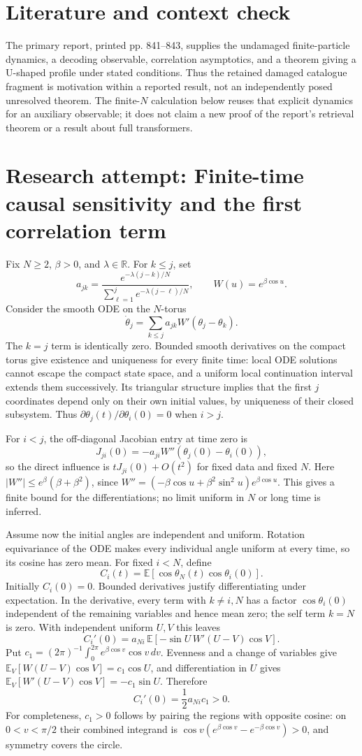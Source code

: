 \documentclass[11pt]{article}
\begin{document}
\section{Literature and context check}
The primary report, printed pp. 841--843, supplies the undamaged finite-particle dynamics, a decoding observable, correlation asymptotics, and a theorem giving a U-shaped profile under stated conditions. Thus the retained damaged catalogue fragment is motivation within a reported result, not an independently posed unresolved theorem. The finite-$N$ calculation below reuses that explicit dynamics for an auxiliary observable; it does not claim a new proof of the report's retrieval theorem or a result about full transformers.
\section{Research attempt: Finite-time causal sensitivity and the first correlation term}

Fix $N\geq2$, $\beta>0$, and $\lambda\in\mathbb R$. For $k\leq j$, set
\[
a_{jk}=\frac{e^{-\lambda(j-k)/N}}{\sum_{\ell=1}^j e^{-\lambda(j-\ell)/N}},
\qquad W(u)=e^{\beta\cos u}.
\]
Consider the smooth ODE on the $N$-torus
\[
\dot\theta_j=\sum_{k\leq j}a_{jk}W'(\theta_j-\theta_k).
\]
The $k=j$ term is identically zero. Bounded smooth derivatives on the compact torus give existence and uniqueness for every finite time: local ODE solutions cannot escape the compact state space, and a uniform local continuation interval extends them successively. Its triangular structure implies that the first $j$ coordinates depend only on their own initial values, by uniqueness of their closed subsystem. Thus $\partial\theta_j(t)/\partial\theta_i(0)=0$ when $i>j$.

For $i<j$, the off-diagonal Jacobian entry at time zero is
\[
J_{ji}(0)=-a_{ji}W''(\theta_j(0)-\theta_i(0)),
\]
so the direct influence is $tJ_{ji}(0)+O(t^2)$ for fixed data and fixed $N$. Here $|W''|\leq e^\beta(\beta+\beta^2)$, since $W''=(-\beta\cos u+\beta^2\sin^2u)e^{\beta\cos u}$. This gives a finite bound for the differentiations; no limit uniform in $N$ or long time is inferred.

Assume now the initial angles are independent and uniform. Rotation equivariance of the ODE makes every individual angle uniform at every time, so its cosine has zero mean. For fixed $i<N$, define
\[
C_i(t)=\mathbb E[\cos\theta_N(t)\cos\theta_i(0)].
\]
Initially $C_i(0)=0$. Bounded derivatives justify differentiating under expectation. In the derivative, every term with $k\ne i,N$ has a factor $\cos\theta_i(0)$ independent of the remaining variables and hence mean zero; the self term $k=N$ is zero. With independent uniform $U,V$ this leaves
\[
C_i'(0)=a_{Ni}\,\mathbb E[-\sin U\,W'(U-V)\cos V].
\]
Put $c_1=(2\pi)^{-1}\int_0^{2\pi}e^{\beta\cos v}\cos v\,dv$. Evenness and a change of variables give $\mathbb E_V[W(U-V)\cos V]=c_1\cos U$, and differentiation in $U$ gives $\mathbb E_V[W'(U-V)\cos V]=-c_1\sin U$. Therefore
\[
C_i'(0)=\frac12a_{Ni}c_1>0.
\]
For completeness, $c_1>0$ follows by pairing the regions with opposite cosine: on $0<v<\pi/2$ their combined integrand is $\cos v(e^{\beta\cos v}-e^{-\beta\cos v})>0$, and symmetry covers the circle.
\end{document}
